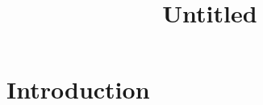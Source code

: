 \documentclass{amsart}
\title{Untitled}
\theoremstyle{plain}
\theoremstyle{definition}
\theoremstyle{remark}
\begin{document}
\maketitle

\section{Introduction}
\end{document}
